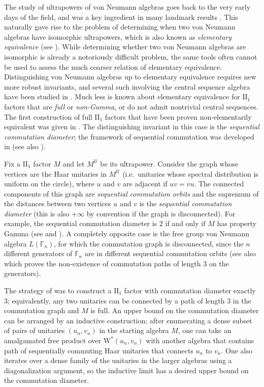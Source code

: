 \documentclass[10pt]{amsart}
\numberwithin{equation}{section}
\theoremstyle{definition}
\begin{document}
The study of ultrapowers of von Neumann algebras goes back to the very early days of the field, and was a key ingredient in many landmark results \cite{DiLa, ZM, McD1, McD2, Connes}.  This naturally gave rise to the problem of determining when two von Neumann algebras have isomorphic ultrapowers, which is also known as \emph{elementary equivalence} (see \cite{FHS}).  While determining whether two von Neumann algebras are isomorphic is already a notoriously difficult problem, the same tools often cannot be used to assess the much coarser relation of elementary equivalence.  Distinguishing von Neumann algebras up to elementary equivalence requires new more robust invariants, and several such involving the central sequence algebra have been studied in \cite{BCI15, GH, goldbring2023uniformly}.  Much less is known about elementary equivalence for $\mathrm{II}_1$ factors that are \emph{full} or \emph{non-Gamma}, or do not admit nontrivial central sequences.  The first construction of full $\mathrm{II}_1$ factors that have been proven non-elementarily equivalent was given in \cite{CIKE23}.  The distinguishing invariant in this case is the \emph{sequential commutation diameter}; the framework of sequential commutation was developed in \cite{elayavalli2023sequential} (see also \cite{gao2024internalsequentialcommutationsingle}).

Fix a $\mathrm{II}_1$ factor $M$ and let $M^{\mathcal{U}}$ be its ultrapower.  Consider the graph whose vertices are the Haar unitaries in $M^{\mathcal{U}}$ (i.e.\ unitaries whose spectral distribution is uniform on the circle), where $u$ and $v$ are adjacent if $uv = vu$.  The connected components of this graph are \emph{sequential commutation orbits} and the supremum of the distances between two vertices $u$ and $v$ is the \emph{sequential commutation diameter} (this is also $+\infty$ by convention if the graph is disconnected).  For example, the sequential commutation diameter is $2$ if and only if $M$ has property Gamma (see \cite[Corollary 4.11]{shen2019reducible} and \cite[Theorem 4.2]{elayavalli2023sequential}).  A completely opposite case is the free group von Neumann algebra $L(\mathbb{F}_n)$, for which the commutation graph is disconnected, since the $n$ different generators of $\mathbb{F}_n$ are in different sequential commutation orbits \cite{Hayes8, jekel2024upgradedfreeindependencephenomena} (see also \cite{houdayer2023asymptotic} which proves the non-existence of commutation paths of length 3 on the generators).

The strategy of \cite{CIKE23} was to construct a $\mathrm{II}_1$ factor with commutation diameter exactly $3$; equivalently, any two unitaries can be connected by a path of length $3$ in the commutation graph and $M$ is full.  An upper bound on the commutation diameter can be arranged by an inductive construction; after enumerating a dense subset of pairs of unitaries $(u_n,v_n)$ in the starting algebra $M$, one can take an amalgamated free product over $\mathrm{W}^*(u_n,v_n)$ with another algebra that contains path of sequentially commuting Haar unitaries that connects $u_n$ to $v_n$.  One also iterates over a dense family of the unitaries in the larger algebras using a diagonalization argument, so the inductive limit has a desired upper bound on the commutation diameter.
\end{document}
